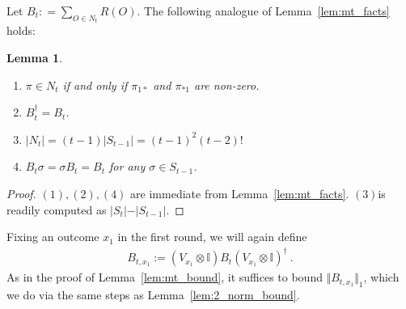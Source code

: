 \documentclass[11pt]{article}
\newtheorem{lemma}[theorem]{Lemma}
\newcommand{\id}{\ensuremath{\mathbb{I}}}
\begin{document}
    Let $B_{t} : = \sum_{O \in N_t}R(O)$. The following analogue of Lemma~\ref{lem:mt_facts} holds:
    \begin{lemma}\label{lem:nt_facts}
        \begin{enumerate}
            \item $\pi \in N_t$ if and only if $\pi_{1*}$ and $\pi_{*1}$ are non-zero.
            \item $B_t^\dagger = B_t$.
            \item $\vert N_t \vert = (t-1)\vert S_{t-1}\vert = (t-1)^2 (t-2)!$
            \item $B_t \sigma = \sigma B_t = B_t$ for any $\sigma \in S_{t-1}$.
        \end{enumerate}
    \end{lemma}
    \begin{proof}
        $(1), (2), (4)$ are immediate from Lemma~\ref{lem:mt_facts}. $(3)$is readily computed as $\vert S_t\vert - \vert S_{t-1}\vert$.
    \end{proof}


    Fixing an outcome $x_1$ in the first round, we will again define
    \begin{align}
        B_{t,x_1} := (V_{x_1}\otimes \id) B_t (V_{x_1} \otimes \id)^\dagger\ .
    \end{align}
    As in the proof of Lemma~\ref{lem:mt_bound}, it suffices to bound $\Vert B_{t,x_{1}}\Vert_1$, which we do via the same steps as Lemma~\ref{lem:2_norm_bound}.
\end{document}
